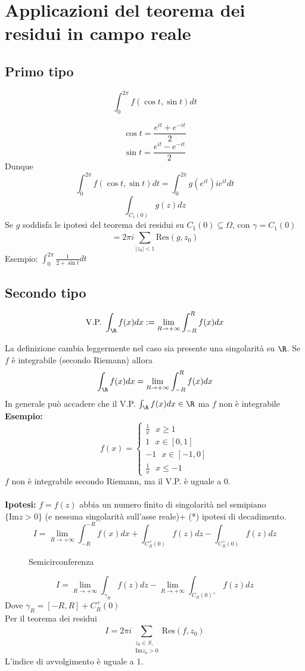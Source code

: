 

\section{Applicazioni del teorema dei residui in campo reale}
\subsection{Primo tipo}
\begin{tcolorbox}
\[\int_{0}^{2\pi} f(\cos t, \sin t)dt\]
\end{tcolorbox}
\[\cos t = \frac{e^{it}+e^{-it}}{2}\]
\[\sin t = \frac{e^{it}-e^{-it}}{2}\]
Dunque 
\[\int_{0}^{2\pi} f(\cos t, \sin t)dt=\int_{0}^{2\pi} g(e^{it})ie^{it}dt \]
\[\int_{C_1(0)}^{} g(z)dz\]
Se $g$ soddisfa le ipotesi del teorema dei residui su $C_1(0) \subseteq  \Omega$, con $\gamma=C_1(0)$
\[=2\pi i \sum_{|z_0|<1}^{} \text{Res}(g,z_0)\]
Esempio: $\int_{0}^{2\pi} \frac{1}{2+\sin t}dt$
\subsection{Secondo tipo}
\begin{tcolorbox}	
	\[\text{V.P.  }\int_{\R}^{} f(x)dx:= \lim_{R \to +\infty} \int_{-R}^{R} f(x)dx \] 
\end{tcolorbox}
La definizione cambia leggermente nel caso sia presente una singolarità su $\R$.
Se $f$ è integrabile (secondo Riemann) allora 
\[\int_{\R}^{} f(x)dx=\lim_{R \to +\infty} \int_{-R}^{R} f(x)dx\]
In generale può accadere che il V.P. $\int_{\R}^{} f(x)dx \in\R$ ma $f$ non è integrabile
\textbf{Esempio:} 
\[f(x)=\begin{cases}
	\frac{1}{x}\ \ \ x\ge 1\\
	1\ \ \ x\in[0,1]\\
	-1\ \ \ x\in[-1,0]\\
	\frac{1}{x}\ \ \ x\le -1
\end{cases}
\]
$f$ non è integrabile secondo Riemann, ma il V.P. è uguale a 0.\\\divider
\\\textbf{Ipotesi: }$f=f(z)$ abbia un numero finito di singolarità nel semipiano $\{\text{Im}z>0\} $ (e nessuna singolarità sull'asse reale)+ (*) ipotesi di decadimento.
\[I=\lim_{R \to +\infty} \int_{-R}^{-R} f(x)dx+\int_{C_R^+(0)}^{} f(z)dz-\int_{C_R^+(0)}^{} f(z)dz \]
\begin{figure}[ht]
    \centering
    \caption{Semicirconferenza}
    \label{fig:semicirconferenza}
\end{figure}
\[I=\lim_{R \to +\infty} \int_{\gamma_R}{f(z)dz} -\lim_{R \to +\infty} \int_{C_R(0)^+}^{} f(z)dz\]
Dove $\gamma_R=[-R,R]+C_R^+(0)$
\\Per il teorema dei residui
\[I=2\pi i \sum_{\substack{z_0\in S,\\  \text{Im}z_0>0}}^{} \text{Res}(f,z_0)\]
L'indice di avvolgimento è uguale a 1.
